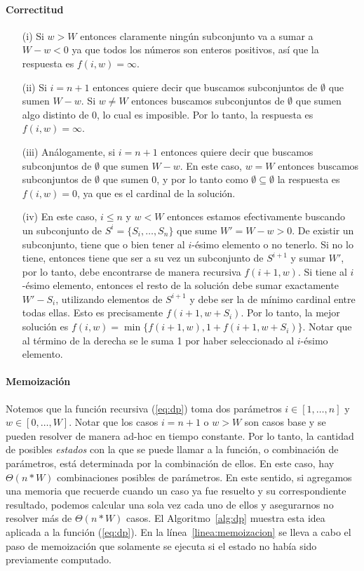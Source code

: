 \documentclass[10pt,a4paper]{article}
\begin{document}
\paragraph{Correctitud}
\begin{enumerate}
    \item[(i)] {Si $w > W$ entonces claramente ningún subconjunto va a sumar a $W-w < 0$ ya que todos los números son enteros positivos, así que la respuesta es $f(i, w) = \infty$.}
    \item[(ii)] { Si $i = n+1$ entonces quiere decir que buscamos subconjuntos de $\emptyset$ que sumen $W-w$. Si $w \neq W$ entonces buscamos subconjuntos de $\emptyset$ que sumen algo distinto de 0, lo cual es imposible. Por lo tanto, la respuesta es $f(i, w) = \infty$.}
    \item[(iii)] { Análogamente, si $i = n+1$ entonces quiere decir que buscamos subconjuntos de $\emptyset$ que sumen $W-w$. En este caso, $w = W$ entonces buscamos subconjuntos de $\emptyset$ que sumen 0, y por lo tanto como $\emptyset \subseteq \emptyset$ la respuesta es $f(i, w) = 0$, ya que es el cardinal de la solución.}
    \item[(iv)] { En este caso, $i \leq n$ y $w < W$ entonces estamos efectivamente buscando un subconjunto de $S^i = \{S_i, \hdots, S_n\}$ que sume $W' = W - w > 0$. De existir un subconjunto, tiene que o bien tener al $i$-ésimo elemento o no tenerlo. Si no lo tiene, entonces tiene que ser a su vez un subconjunto de $S^{i+1}$ y sumar $W'$, por lo tanto, debe encontrarse de manera recursiva $f(i+1, w)$. Si tiene al $i$-ésimo elemento, entonces el resto de la solución debe sumar exactamente $W' - S_i$, utilizando elementos de $S^{i+1}$ y debe ser la de mínimo cardinal entre todas ellas. Esto es precisamente $f(i+1, w+S_i)$. Por lo tanto, la mejor solución es $f(i, w) = \min \{ f(i+1, w), 1 + f(i+1, w + S_i) \}$. Notar que al término de la derecha se le suma 1 por haber seleccionado al $i$-ésimo elemento.}
\end{enumerate}

\paragraph{Memoización}
Notemos que la función recursiva (\ref{eq:dp}) toma dos parámetros $i \in [1, \hdots, n]$ y $w \in [0, \hdots, W]$. Notar que los casos $i = n+1$ o $w > W$ son casos base y se pueden resolver de manera ad-hoc en tiempo constante. Por lo tanto, la cantidad de posibles \emph{estados} con la que se puede llamar a la función, o combinación de parámetros, está determinada por la combinación de ellos. En este caso, hay $\Theta(n * W)$ combinaciones posibles de parámetros. En este sentido, si agregamos una memoria que recuerde cuando un caso ya fue resuelto y su correspondiente resultado, podemos calcular una sola vez cada uno de ellos y asegurarnos no resolver más de $\Theta(n * W)$ casos. El Algoritmo~\ref{alg:dp} muestra esta idea aplicada a la función (\ref{eq:dp}). En la línea~\ref{linea:memoizacion} se lleva a cabo el paso de memoización que solamente se ejecuta si el estado no había sido previamente computado.
\end{document}
